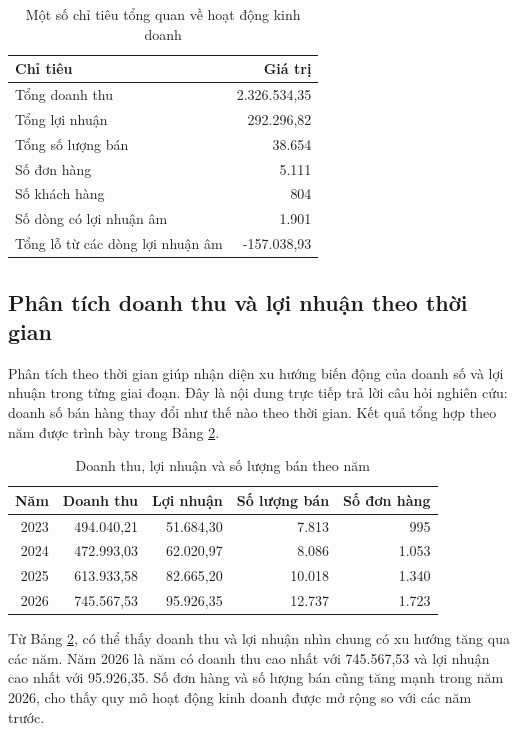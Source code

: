 \begin{table}[H]
\centering
\caption{Một số chỉ tiêu tổng quan về hoạt động kinh doanh}
\label{tab:kpi-tong-quan}
\begin{tabular}{|l|r|}
\hline
\textbf{Chỉ tiêu} & \textbf{Giá trị} \\
\hline
Tổng doanh thu & 2.326.534,35 \\
\hline
Tổng lợi nhuận & 292.296,82 \\
\hline
Tổng số lượng bán & 38.654 \\
\hline
Số đơn hàng & 5.111 \\
\hline
Số khách hàng & 804 \\
\hline
Số dòng có lợi nhuận âm & 1.901 \\
\hline
Tổng lỗ từ các dòng lợi nhuận âm & -157.038,93 \\
\hline
\end{tabular}
\end{table}

\subsection*{\thesubsection\quad Phân tích doanh thu và lợi nhuận theo thời gian}

Phân tích theo thời gian giúp nhận diện xu hướng biến động của doanh số và lợi nhuận trong từng giai đoạn. Đây là nội dung trực tiếp trả lời câu hỏi nghiên cứu: doanh số bán hàng thay đổi như thế nào theo thời gian. Kết quả tổng hợp theo năm được trình bày trong Bảng \ref{tab:theo-nam}.

\begin{table}[H]
\centering
\caption{Doanh thu, lợi nhuận và số lượng bán theo năm}
\label{tab:theo-nam}
\begin{tabular}{|r|r|r|r|r|}
\hline
\textbf{Năm} & \textbf{Doanh thu} & \textbf{Lợi nhuận} & \textbf{Số lượng bán} & \textbf{Số đơn hàng} \\
\hline
2023 & 494.040,21 & 51.684,30 & 7.813 & 995 \\
\hline
2024 & 472.993,03 & 62.020,97 & 8.086 & 1.053 \\
\hline
2025 & 613.933,58 & 82.665,20 & 10.018 & 1.340 \\
\hline
2026 & 745.567,53 & 95.926,35 & 12.737 & 1.723 \\
\hline
\end{tabular}
\end{table}

Từ Bảng \ref{tab:theo-nam}, có thể thấy doanh thu và lợi nhuận nhìn chung có xu hướng tăng qua các năm. Năm 2026 là năm có doanh thu cao nhất với 745.567,53 và lợi nhuận cao nhất với 95.926,35. Số đơn hàng và số lượng bán cũng tăng mạnh trong năm 2026, cho thấy quy mô hoạt động kinh doanh được mở rộng so với các năm trước.

